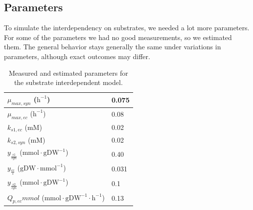 \documentclass[10pt]{report}
\begin{document}
\subsection{Parameters}
To simulate the interdependency on substrates, we needed a lot more parameters. For some of the parameters we had no good measurements, so we estimated them. The general behavior stays generally the same under variations in parameters, although exact outcomes may differ.

\begin{table}[!ht]
 \begin{center}  
  \begin{tabular}{|l|l|}
   \hline
   $\mu_{max,syn}$ ($\text{h}^{-1}$) & 0.075 \\ \hline
   $\mu_{max,ec}$ ($\text{h}^{-1}$) & 0.08 \\ \hline
   $k_{s1,ec}$ ($\text{mM}$) & 0.02 \\ \hline
   $k_{s2,syn}$ ($\text{mM}$) & 0.02 \\ \hline
   $y_{\frac{s1}{syn}}$ ($\text{mmol}\cdot\text{gDW}^{-1}$) & 0.40 \\ \hline
   $y_{\frac{ec}{s}}$ ($\text{gDW}\cdot\text{mmol}^{-1}$) & 0.031 \\ \hline
   $y_{\frac{s2}{syn}}$ ($\text{mmol}\cdot\text{gDW}^{-1}$) & 0.1 \\ \hline
   $Q_{p,ec} mmol$ ($\text{mmol}\cdot \text{gDW}^{-1}\cdot\text{h}^{-1}$) & 0.13 \\
   \hline   
  \end{tabular}
  \caption{Measured and estimated parameters for the substrate interdependent model.}
  \label{tab:sdp}
 \end{center}
\end{table}
\end{document}
